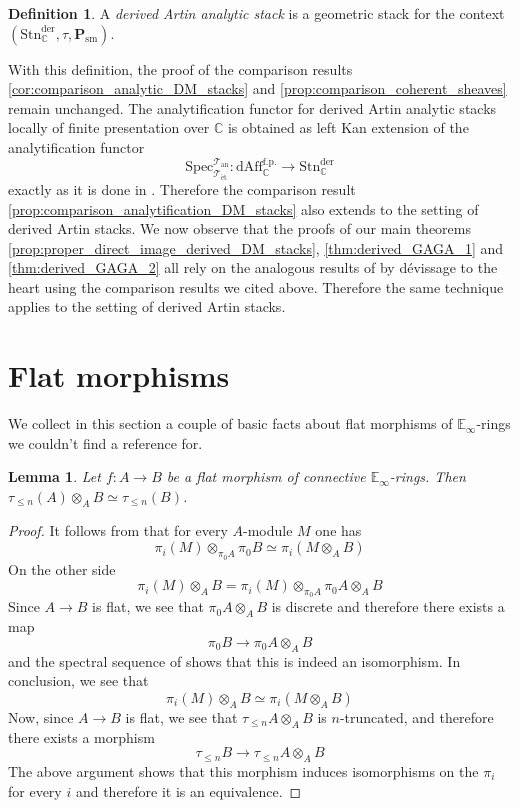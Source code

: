 \documentclass[12pt,a4paper,reqno]{amsart}
\theoremstyle{plain}
\newtheorem{lem}[thm]{Lemma}
\theoremstyle{definition}
\newtheorem{defin}[thm]{Definition}
\theoremstyle{remark}
\numberwithin{equation}{section}
\begin{document}
\begin{defin}
	A \emph{derived Artin analytic stack} is a geometric stack for the context $({\mathrm{Stn}^{\mathrm{der}}_{\mathbb C}}, \tau, \mathbf P_{\mathrm{sm}})$.
\end{defin}

With this definition, the proof of the comparison results \cref{cor:comparison_analytic_DM_stacks} and \cref{prop:comparison_coherent_sheaves} remain unchanged. The analytification functor for derived Artin analytic stacks locally of finite presentation over $\mathbb C$ is obtained as left Kan extension of the analytification functor
\[ {\mathrm{Spec}^{{\mathcal T}_{\mathrm{an}}}_{{\mathcal T}_{\mathrm{\acute{e}t}}}} \colon \mathrm{dAff}^{\mathrm{f.p.}}_{\mathbb C} \to {\mathrm{Stn}^{\mathrm{der}}_{\mathbb C}} \]
exactly as it is done in \cite{Porta_Yu_Higher_analytic_stacks_2014, Toen_Algebrisation_2008}.
Therefore the comparison result \cref{prop:comparison_analytification_DM_stacks} also extends to the setting of derived Artin stacks.
We now observe that the proofs of our main theorems \ref{prop:proper_direct_image_derived_DM_stacks}, \ref{thm:derived_GAGA_1} and \ref{thm:derived_GAGA_2} all rely on the analogous results of \cite{Porta_Yu_Higher_analytic_stacks_2014} by d\'evissage to the heart using the comparison results we cited above.
Therefore the same technique applies to the setting of derived Artin stacks.

\appendix

\section{Flat morphisms}

We collect in this section a couple of basic facts about flat morphisms of $\mathbb E_\infty$-rings we couldn't find a reference for.

\begin{lem}
	Let $f \colon A \to B$ be a flat morphism of connective $\mathbb E_\infty$-rings.
	Then $\tau_{\le n}(A) \otimes_A B \simeq \tau_{\le n}(B)$.
\end{lem}

\begin{proof}
	It follows from \cite[7.2.2.13]{Lurie_Higher_algebra} that for every $A$-module $M$ one has
	\[ \pi_i(M) \otimes_{\pi_0 A} \pi_0 B \simeq \pi_i(M \otimes_A B) \]
	On the other side
	\[ \pi_i(M) \otimes_A B = \pi_i(M) \otimes_{\pi_0 A} \pi_0 A \otimes_A B \]
	Since $A \to B$ is flat, we see that $\pi_0 A \otimes_A B$ is discrete and therefore there exists a map
	\[ \pi_0 B \to \pi_0 A \otimes_A B \]
	and the spectral sequence of \cite[7.2.1.19]{Lurie_Higher_algebra} shows that this is indeed an isomorphism.
	In conclusion, we see that
	\[ \pi_i(M) \otimes_A B \simeq \pi_i(M \otimes_A B) \]
	Now, since $A \to B$ is flat, we see that $\tau_{\le n} A \otimes_A B$ is $n$-truncated, and therefore there exists a morphism
	\[ \tau_{\le n} B \to \tau_{\le n} A \otimes_A B \]
	The above argument shows that this morphism induces isomorphisms on the $\pi_i$ for every $i$ and therefore it is an equivalence.
\end{proof}
\end{document}

